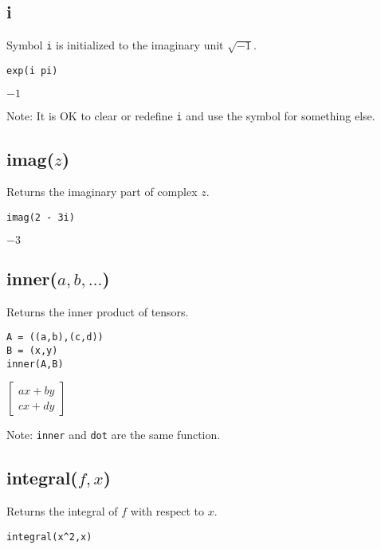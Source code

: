 \subsection*{i}

Symbol {\tt i} is initialized to the imaginary unit $\sqrt{-1}$.

{\color{blue}
\begin{verbatim}
exp(i pi)
\end{verbatim}
}

\noindent
$-1$

\bigskip
\noindent
Note: It is OK to clear or redefine {\tt i} and use the symbol for something else.

\subsection*{imag($z$)}

Returns the imaginary part of complex $z$.

{\color{blue}
\begin{verbatim}
imag(2 - 3i)
\end{verbatim}
}

\noindent
$-3$

\subsection*{inner($a,b,\ldots$)}

Returns the inner product of tensors.

{\color{blue}
\begin{verbatim}
A = ((a,b),(c,d))
B = (x,y)
inner(A,B)
\end{verbatim}
}

\noindent
$\displaystyle
\begin{bmatrix}
ax+by\\
cx+dy
\end{bmatrix}
$

\bigskip
\noindent
Note: {\tt inner} and {\tt dot} are the same function.

\subsection*{integral($f,x$)}

Returns the integral of $f$ with respect to $x$.

{\color{blue}
\begin{verbatim}
integral(x^2,x)
\end{verbatim}
}

